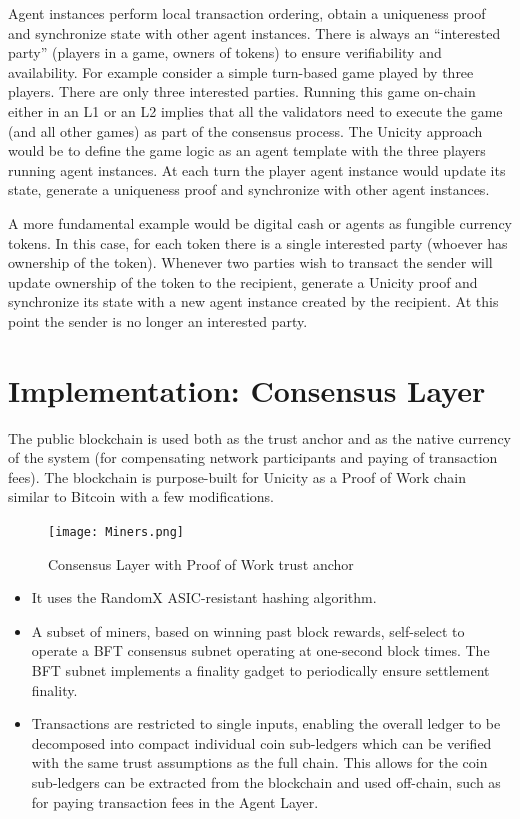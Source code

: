 \documentclass{article}
\begin{document}
Agent instances perform local transaction ordering, obtain a uniqueness proof and synchronize state with other agent instances. There is always an ``interested party'' (players in a game, owners of tokens) to ensure verifiability and availability. For example consider a simple turn-based game played by three players. There are only three interested parties. Running this game on-chain either in an L1 or an L2 implies that all the validators  need to execute the game (and all other games) as part of the consensus process. The Unicity approach would be to define the game logic as an agent template with the three players running agent instances. At each turn the player agent instance would update its state, generate a uniqueness proof and synchronize with other agent instances.

A more fundamental example would be digital cash or agents as fungible currency tokens. In this case, for each token there is a single interested party (whoever has ownership of the token). Whenever two parties wish to transact the sender will update ownership of the token to the recipient, generate a Unicity proof and synchronize its state with a new agent instance created by the recipient. At this point the sender is no longer an interested party.

\section{Implementation: Consensus Layer}

The public blockchain is used both as the trust anchor and as the native currency of the system (for compensating network participants and paying of transaction fees). The blockchain is purpose-built for Unicity as a Proof of Work chain similar to Bitcoin with a few modifications.

\begin{figure}[htbp]
    \centering
    \texttt{[image: Miners.png]}
    \caption{Consensus Layer with Proof of Work trust anchor}
    \label{fig:miners}
\end{figure}

\begin{itemize}
\setlength{\leftmargin}{1em}
 \item It uses the RandomX ASIC-resistant hashing algorithm.
 \item A subset of miners, based on winning past block rewards, self-select to operate a BFT consensus subnet operating at one-second block times. The BFT subnet implements a finality gadget to periodically ensure settlement finality.
 \item Transactions are restricted to single inputs, enabling the overall ledger to be decomposed into compact individual coin sub-ledgers which can be verified with the same trust assumptions as the full chain.  This allows for the coin sub-ledgers can be extracted from the blockchain and used off-chain, such as for paying transaction fees in the Agent Layer.
\end{itemize}
\end{document}
